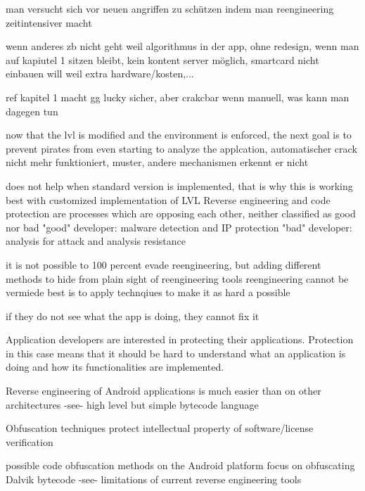 man versucht sich vor neuen angriffen zu schützen indem man reengineering zeitintensiver macht

wenn anderes zb nicht geht weil algorithmus in der app, ohne redesign, wenn man auf kapiutel 1 sitzen bleibt, kein kontent server möglich, smartcard nicht einbauen will weil extra hardware/kosten,...

ref kapitel 1 macht gg lucky sicher, aber crakcbar wenn manuell, was kann man dagegen tun



now that the lvl is modified and the environment is enforced, the next goal is to prevent pirates from even starting to analyze the applcation, automatischer crack nicht mehr funktioniert, muster, andere mechanismen erkennt er nicht

does not help when standard version is implemented, that is why this is working best with customized implementation of LVL
%
Reverse engineering and code protection are processes which are opposing each other, neither classified as good nor bad\newline
"good" developer: malware detection and IP protection\newline
"bad" developer: analysis for attack and analysis resistance

\cite{kovachevaMaster}
%
it is not possible to 100 percent evade reengineering, but adding different methods to hide from plain sight of reengineering tools
%
reengineering cannot be vermiede
best is to apply technqiues to make it as hard a possible
\cite{munteanLicense}
%

if they do not see what the app is doing, they cannot fix it

Application developers are interested in protecting their applications. Protection in this case means that it should be hard to understand
what an application is doing and how its functionalities are implemented.\newline


Reverse engineering of Android applications is much easier than on other architectures -see- high level but simple bytecode language\newline

Obfuscation techniques protect intellectual property of software/license verification\newline

possible code obfuscation methods on the Android platform focus on obfuscating Dalvik bytecode -see- limitations of current reverse engineering tools\newline

